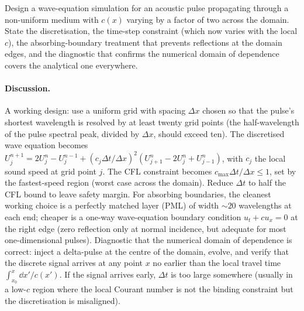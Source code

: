 \begin{exercise}
Design a wave-equation simulation for an acoustic pulse
propagating through a non-uniform medium with $c(x)$ varying by
a factor of two across the domain. State the discretisation, the
time-step constraint (which now varies with the local $c$), the
absorbing-boundary treatment that prevents reflections at the
domain edges, and the diagnostic that confirms the numerical
domain of dependence covers the analytical one everywhere.

\paragraph{Discussion.}
A working design: use a uniform grid with spacing $\Delta x$
chosen so that the pulse's shortest wavelength is resolved by at
least twenty grid points (the half-wavelength of the pulse
spectral peak, divided by $\Delta x$, should exceed ten). The
discretised wave equation becomes $U_{j}^{n+1} = 2 U_{j}^{n} -
U_{j}^{n-1} + (c_{j}\Delta t/\Delta x)^{2}(U_{j+1}^{n} -
2 U_{j}^{n} + U_{j-1}^{n})$, with $c_{j}$ the local sound speed
at grid point $j$. The CFL constraint becomes
$c_{\max}\Delta t/\Delta x \leq 1$, set by the fastest-speed
region (worst case across the domain). Reduce $\Delta t$ to
half the CFL bound to leave safety margin. For absorbing
boundaries, the cleanest working choice is a perfectly matched
layer (PML) of width $\sim 20$ wavelengths at each end; cheaper
is a one-way wave-equation boundary condition $u_{t} + c
u_{x} = 0$ at the right edge (zero reflection only at normal
incidence, but adequate for most one-dimensional pulses).
Diagnostic that the numerical domain of dependence is correct:
inject a delta-pulse at the centre of the domain, evolve, and
verify that the discrete signal arrives at any point $x$ no
earlier than the local travel time $\int_{x_{0}}^{x} \dd x'/c(x')$.
If the signal arrives early, $\Delta t$ is too large somewhere
(usually in a low-$c$ region where the local Courant number is
not the binding constraint but the discretisation is misaligned).
\end{exercise}

